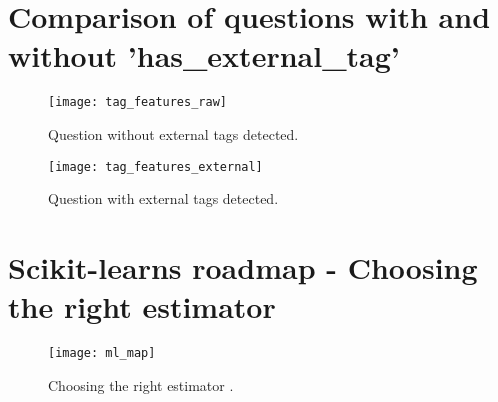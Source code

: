 \begin{comment}
td-10l-unprocessed-up-numeric
------------------------------------
Classification Report:
			Precision	Recall		F1-score	Support
-1.0       0.81      0.90      0.85      1154
1.0       0.79      0.62      0.69       651
avg / total       0.80      0.80      0.80      1805


td-10l-unprocessed-up-tags
------------------------------------
Classification Report:
			Precision	Recall		F1-score	Support
-1.0       0.80      0.79      0.79      1985
1.0       0.79      0.80      0.80      2009
avg / total       0.79      0.79      0.79      3994
\end{lstlisting}

\end{comment}
				
\clearpage
\section{Comparison of questions with and without 'has\_external\_tag'}
\label{app:comparison_question_external_tags}
\begin{figure}[ht]
	\centering
	\texttt{[image: tag\_features\_raw]}
	\caption{Question without external tags detected.}
	\label{fig:tag_features_raw}
\end{figure}
\begin{figure}[ht]
	\centering
	\texttt{[image: tag\_features\_external]}
	\caption{Question with external tags detected.}
	\label{fig:tag_features_external}
\end{figure}

\clearpage
\section{Scikit-learns roadmap - Choosing the right estimator}
\label{app:ml_map}
\begin{figure}[ht]
	\centering
	\texttt{[image: ml\_map]}
	\caption[Choosing the right estimator]{Choosing the right estimator \cite{Scikitlearn.org2016i}.}
	\label{fig:ml_map}
\end{figure}

\clearpage
